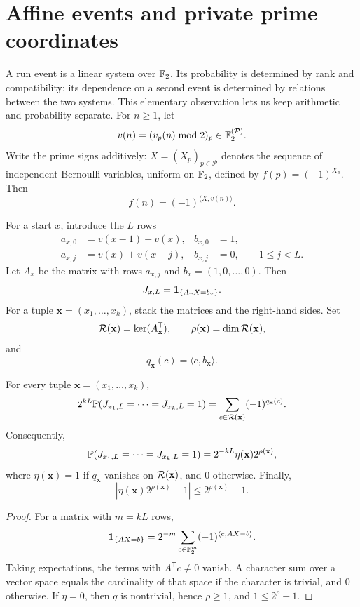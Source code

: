 \section{Affine events and private prime coordinates}\label{sec:affine-one-window}
A run event is a linear system over $\mathbb F_2$. Its probability is determined by
rank and compatibility; its dependence on a second event is determined by
relations between the two systems. This elementary observation lets us keep
arithmetic and probability separate.
For $n\ge1$, let
\[
 v(n)=(v_p(n)\bmod2)_p\in\mathbb F_2^{(\mathcal P)}.
\]
Write the prime signs additively: $X=(X_p)_{p\in\mathcal P}$
denotes the sequence of independent Bernoulli variables, uniform on
$\mathbb F_2$, defined by $f(p)=(-1)^{X_p}$. Then
\[
 f(n)=(-1)^{\langle X,v(n)\rangle}.
\]

For a start $x$, introduce the $L$ rows
\begin{align*}
 a_{x,0}&=v(x-1)+v(x), & b_{x,0}&=1,\\
 a_{x,j}&=v(x)+v(x+j), & b_{x,j}&=0,
 \qquad 1\le j<L.
\end{align*}
Let $A_x$ be the matrix with rows $a_{x,j}$ and $b_x=(1,0,\dots,0)$. Then
\[
 J_{x,L}=\mathbf 1_{\{A_xX=b_x\}}.
\]
For a tuple $\mathbf x=(x_1,\dots,x_k)$, stack the matrices and the right-hand sides. Set
\[
 \mathcal R(\mathbf x)=\ker(A_{\mathbf x}^{\mathsf T}),
 \qquad
 \rho(\mathbf x)=\dim\mathcal R(\mathbf x),
\]
and
\[
 q_{\mathbf x}(c)=\langle c,b_{\mathbf x}\rangle.
\]

\begin{lemma}\label{lem:fourier}
For every tuple $\mathbf x=(x_1,\dots,x_k)$,
\[
 2^{kL}\mathbb P(J_{x_1,L}=\cdots=J_{x_k,L}=1)
 =\sum_{c\in\mathcal R(\mathbf x)}(-1)^{q_{\mathbf x}(c)}.
\]
Consequently,
\[
 \mathbb P(J_{x_1,L}=\cdots=J_{x_k,L}=1)
 =2^{-kL}\eta(\mathbf x)2^{\rho(\mathbf x)},
\]
where $\eta(\mathbf x)=1$ if $q_{\mathbf x}$ vanishes on $\mathcal R(\mathbf x)$, and $0$ otherwise. Finally,
\begin{equation}\label{eq:affine-abs}
\left|\eta(\mathbf x)2^{\rho(\mathbf x)}-1\right|
 \le2^{\rho(\mathbf x)}-1.
\end{equation}
\end{lemma}

\begin{proof}
For a matrix with $m=kL$ rows,
\[
 \mathbf 1_{\{AX=b\}}
 =2^{-m}\sum_{c\in\mathbb F_2^m}(-1)^{\langle c,AX-b\rangle}.
\]
Taking expectations, the terms with $A^{\mathsf T}c\ne0$ vanish. A character sum over a vector space equals the cardinality of that space if the character is trivial, and $0$ otherwise. If $\eta=0$, then $q$ is nontrivial, hence $\rho\ge1$, and $1\le2^\rho-1$.
\end{proof}


